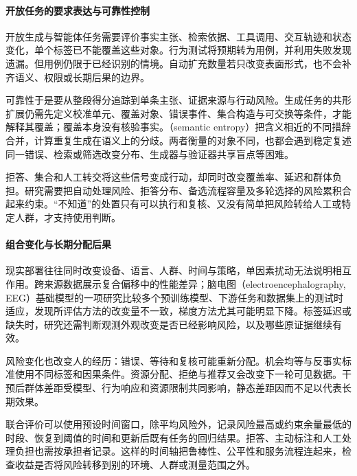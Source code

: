 \paragraph{开放任务的要求表达与可靠性控制}

开放生成与智能体任务需要评价事实主张、检索依据、工具调用、交互轨迹和状态变化，单个标签已不能覆盖这些对象。行为测试将预期转为用例，并利用失败发现遗漏。但用例仍限于已经识别的情境。自动扩充数量若只改变表面形式，也不会补齐语义、权限或长期后果的边界。

可靠性于是要从整段得分追踪到单条主张、证据来源与行动风险。生成任务的共形扩展仍需先定义校准单元、覆盖对象、错误事件、集合构造与可交换等条件，才能解释其覆盖；覆盖本身没有核验事实。（semantic entropy）把含义相近的不同措辞合并，计算重复生成在语义上的分歧。两者衡量的对象不同，也都会遇到稳定复述同一错误、检索或筛选改变分布、生成器与验证器共享盲点等困难。

拒答、集合和人工转交将这些信号变成行动，却同时改变覆盖率、延迟和群体负担。研究需要把自动处理风险、拒答分布、备选流程容量及多轮选择的风险累积合起来约束。“不知道”的处置只有可以执行和复核、又没有简单把风险转给人工或特定人群，才支持使用判断。

\paragraph{组合变化与长期分配后果}

现实部署往往同时改变设备、语言、人群、时间与策略，单因素扰动无法说明相互作用。跨来源数据展示复合偏移中的性能差异；脑电图（electroencephalography, EEG）基础模型的一项研究比较多个预训练模型、下游任务和数据集上的测试时适应，发现所评估方法的改变量不一致，梯度方法尤其可能明显下降。标签延迟或缺失时，研究还需判断观测外观改变是否已经影响风险，以及哪些原证据继续有效。

风险变化也改变人的经历：错误、等待和复核可能重新分配。机会均等与反事实标准使用不同标签和因果条件。资源分配、拒绝与推荐又会改变下一轮可见数据。干预后群体差距受模型、行为响应和资源限制共同影响，静态差距因而不足以代表长期效果。

联合评价可以使用预设时间窗口，除平均风险外，记录风险最高或约束余量最低的时段、恢复到阈值的时间和更新后既有任务的回归结果。拒答、主动标注和人工处理负担也需按承担者记录。这样的时间轴把鲁棒性、公平性和服务流程连起来，检查收益是否将风险转移到别的环境、人群或测量范围之外。


